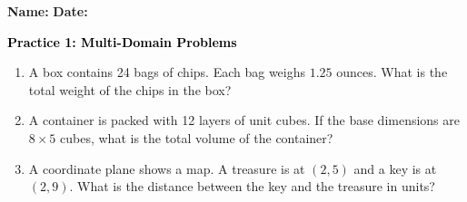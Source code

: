 \documentclass[12pt, letterpaper, fleqn]{article}
\begin{document}
\textbf{Name:} \underline{\hspace{5cm}}
\hfill
\textbf{Date:} \underline{\hspace{3cm}}\\

\begin{tcolorbox}[colback=customteal!20]
    \large\textcolor{black}{\textbf{Practice 1: Multi-Domain Problems}}
\end{tcolorbox}
\begin{enumerate}[itemsep=3.5cm, leftmargin=0.6cm]
\item A box contains 24 bags of chips. Each bag weighs $1.25$ ounces. What is the total weight of the chips in the box?
\vspace{3.5cm}
\item A container is packed with 12 layers of unit cubes. If the base dimensions are $8 \times 5$ cubes, what is the total volume of the container?
\vspace{3.5cm}
\item A coordinate plane shows a map. A treasure is at $(2, 5)$ and a key is at $(2, 9)$. What is the distance between the key and the treasure in units?
\end{enumerate}
\end{document}
